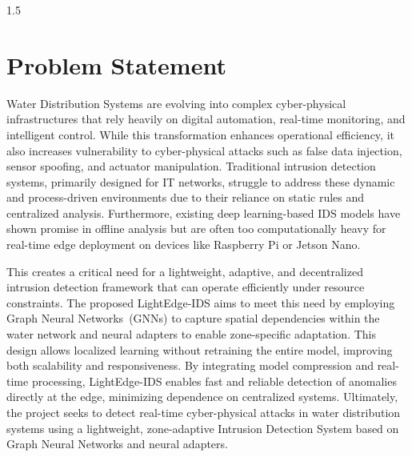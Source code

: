 \newpage
\thispagestyle{empty}
%
\begin{spacing}{1.5}
%
\chapter{Problem Statement}
Water Distribution Systems are evolving into complex cyber-physical infrastructures that rely heavily on digital automation, real-time monitoring, and intelligent control. While this transformation enhances operational efficiency, it also increases vulnerability to cyber-physical attacks such as false data injection, sensor spoofing, and actuator manipulation. Traditional intrusion detection systems, primarily designed for IT networks, struggle to address these dynamic and process-driven environments due to their reliance on static rules and centralized analysis. Furthermore, existing deep learning-based IDS models have shown promise in offline analysis but are often too computationally heavy for real-time edge deployment on devices like Raspberry Pi or Jetson Nano. 

This creates a critical need for a lightweight, adaptive, and decentralized intrusion detection framework that can operate efficiently under resource constraints. The proposed LightEdge-IDS aims to meet this need by employing Graph Neural Networks~(GNNs) to capture spatial dependencies within the water network and neural adapters to enable zone-specific adaptation. This design allows localized learning without retraining the entire model, improving both scalability and responsiveness. By integrating model compression and real-time processing, LightEdge-IDS enables fast and reliable detection of anomalies directly at the edge, minimizing dependence on centralized systems. Ultimately, the project seeks to detect real-time cyber-physical attacks in water distribution systems using a lightweight, zone-adaptive Intrusion Detection System based on Graph Neural Networks and neural adapters.

\end{spacing}
